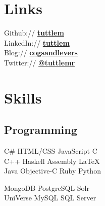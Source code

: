 \documentclass[letterpaper]{deedy-resume} %
\begin{document}
\begin{minipage}[t]{0.33\textwidth} %


\section{Links} 

Github:// \href{https://github.com/tuttlem}{\bf tuttlem} \\
LinkedIn:// \href{http://au.linkedin.com/in/tuttlem/}{\bf tuttlem} \\
Blog:// \href{http://cogsandlevers.blogspot.com/}{\bf cogsandlevers} \\
Twitter:// \href{https://twitter.com/tuttlemr}{\bf @tuttlemr} \\

\sectionspace %


\section{Skills}

\subsection{Programming}

C\# \textbullet{} HTML/CSS \textbullet{} JavaScript \textbullet{} C \\
C++ \textbullet{} Haskell \textbullet{} Assembly \textbullet{} \LaTeX\ \\ 
Java \textbullet{} Objective-C \textbullet{} Ruby \textbullet{} Python

\sectionspace %

MongoDB \textbullet{} PostgreSQL \textbullet{} Solr \\
UniVerse \textbullet{} MySQL \textbullet{} SQL Server 



\end{minipage} %
\hfill
%
\end{document}
